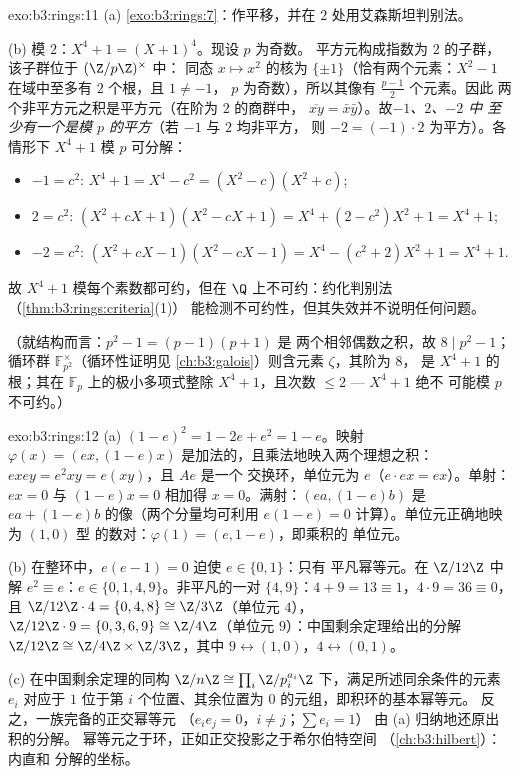 \begin{solution}{exo:b3:rings:11}
(a) \cref{exo:b3:rings:7}：作平移，并在 $2$ 处用艾森斯坦判别法。

(b) 模 $2$：$X^4 + 1 = (X + 1)^4$。现设 $p$ 为奇数。
平方元构成指数为 $2$ 的子群，该子群位于 $(\Z/p\Z)^\times$ 中：
同态 $x \mapsto x^2$ 的核为 $\{\pm 1\}$（恰有两个元素：$X^2
- 1$ 在域中至多有 $2$ 个根，且 $1 \neq -1$，
$p$ 为奇数），所以其像有 $\frac{p-1}2$ 个元素。因此
两个非平方元之积是平方元（在阶为 $2$ 的商群中，
$\overline{xy} = \bar x\bar y$）。故\emph{$-1$、$2$、$-2$ 中
至少有一个是模 $p$ 的平方}（若 $-1$ 与 $2$ 均非平方，
则 $-2 = (-1)\cdot 2$ 为平方）。各情形下 $X^4 + 1$ 模 $p$ 可分解：
\begin{itemize}
  \item $-1 = c^2$: \quad $X^4 + 1 = X^4 - c^2 = (X^2 - c)(X^2 +
        c)$;
  \item $2 = c^2$: \quad $(X^2 + cX + 1)(X^2 - cX + 1) = X^4 + (2
        - c^2)X^2 + 1 = X^4 + 1$;
  \item $-2 = c^2$: \quad $(X^2 + cX - 1)(X^2 - cX - 1) = X^4 -
        (c^2 + 2)X^2 + 1 = X^4 + 1$.
\end{itemize}
故 $X^4+1$ 模每个素数都可约，但在
$\Q$ 上不可约：约化判别法（\cref{thm:b3:rings:criteria}(1)）
能检测不可约性，但其失效并不说明任何问题。

（就结构而言：$p^2 - 1 = (p-1)(p+1)$ 是
两个相邻偶数之积，故 $8 \mid p^2 - 1$；
循环群 $\mathbb F_{p^2}^\times$（循环性证明见
\cref{ch:b3:galois}）则含元素 $\zeta$，其阶为 $8$，
是 $X^4 + 1$ 的根；其在 $\mathbb
F_p$ 上的极小多项式整除 $X^4+1$，且次数 $\leq 2$ --- $X^4+1$ 绝不
可能模 $p$ 不可约。）
\end{solution}

\begin{solution}{exo:b3:rings:12}
(a) $(1-e)^2 = 1 - 2e + e^2 = 1 - e$。映射 $\varphi(x) =
(ex, (1-e)x)$ 是加法的，且乘法地映入两个理想之积：
$exey = e^2xy = e(xy)$，且 $Ae$ 是一个
交换环，单位元为 $e$（$e\cdot ex = ex$）。单射：
$ex = 0$ 与 $(1-e)x = 0$ 相加得 $x = 0$。满射：$(ea,
(1-e)b)$ 是 $ea + (1-e)b$ 的像（两个分量均可利用
$e(1-e) = 0$ 计算）。单位元正确地映为 $(1, 0)$ 型
的数对：$\varphi(1) = (e, 1-e)$，即乘积的
单位元。

(b) 在整环中，$e(e - 1) = 0$ 迫使 $e \in \{0, 1\}$：只有
平凡幂等元。在 $\Z/12\Z$ 中解 $e^2 \equiv e$：$e
\in \{0, 1, 4, 9\}$。非平凡的一对 $\{4, 9\}$：$4 + 9 =
13 \equiv 1$，$4\cdot9 = 36 \equiv 0$，且 $\Z/12\Z\cdot4 =
\{0, 4, 8\} \cong \Z/3\Z$（单位元 $4$），$\Z/12\Z\cdot9 = \{0,
3, 6, 9\} \cong \Z/4\Z$（单位元 $9$）：中国剩余定理给出的分解
$\Z/12\Z \cong \Z/4\Z\times\Z/3\Z$，其中 $9 \leftrightarrow
(1, 0)$，$4 \leftrightarrow (0, 1)$。

(c) 在中国剩余定理的同构 $\Z/n\Z \cong \prod_i
\Z/p_i^{a_i}\Z$ 下，满足所述同余条件的元素 $e_i$
对应于 $1$ 位于第 $i$ 个位置、其余位置为
$0$ 的元组，即积环的基本幂等元。
反之，一族完备的正交幂等元
（$e_ie_j = 0$，$i \neq j$；$\sum e_i = 1$）
由 (a) 归纳地还原出积的分解。
幂等元之于环，正如正交投影之于希尔伯特空间
（\cref{ch:b3:hilbert}）：内直和
分解的坐标。
\end{solution}


